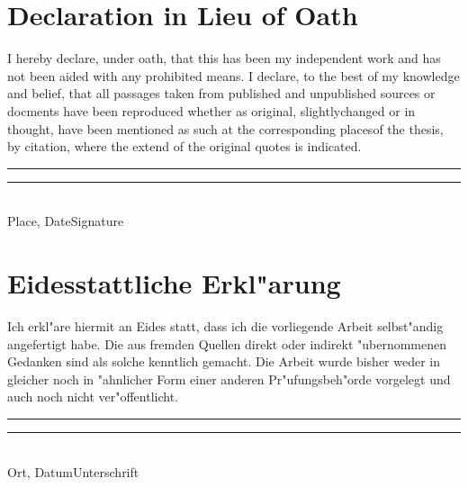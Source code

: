 {\section*{\centering Declaration in Lieu of Oath}
\glqq I hereby declare, under oath, that this \MakeLowercase{\thesis} has been my independent work and has not been aided with any prohibited means. I declare, to the best of my knowledge and belief, that all passages taken from published and unpublished sources or docments have been reproduced whether as original, slightlychanged or in thought, have been mentioned as such at the corresponding placesof the thesis, by citation, where the extend of the original quotes is indicated.\grqq\\[5\baselineskip]
\rule{5cm}{0.2pt}\hfill\rule{5cm}{0.2pt}\\
\phantom{Date }Place, Date\hfill Signature\hspace{15mm}}
{\section*{\centering Eidesstattliche Erkl"arung}
\glqq Ich erkl"are hiermit an Eides statt, dass ich die vorliegende Arbeit selbst"andig angefertigt habe. Die aus fremden Quellen direkt oder indirekt "ubernommenen Gedanken sind als solche kenntlich gemacht. Die Arbeit wurde bisher weder in gleicher noch in "ahnlicher Form einer anderen Pr"ufungsbeh"orde vorgelegt und auch noch nicht ver"offentlicht.\grqq\\[5\baselineskip]
\rule{5cm}{0.2pt}\hfill\rule{5cm}{0.2pt}\\
\phantom{Datum }Ort, Datum\hfill Unterschrift\hspace{15mm}}
\newpage
